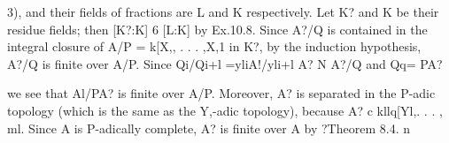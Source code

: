 \begin{theorem}[Theorem 11.2]\label{mcrt-auto-theorem-11-2}
\begin{mathematicalrecord}
3), and their fields of fractions are L and K respectively. Let
K? and K be their residue fields; then [K?:K] 6 [L:K] by Ex.10.8. Since A?/Q
is contained in the integral closure of A/P = k[X,, . . . ,X,1 in K?, by the
induction hypothesis, A?/Q is finite over A/P. Since
        Qi/Qi+l   =yliA!/yli+l
                                 A? N A?/Q and Qq= PA?

 we see that Al/PA? is finite over A/P. Moreover, A? is separated in the P-adic
topology (which is the same as the Y,-adic topology), because
 A? c kllq[Yl,. . . , ml. Since A is P-adically complete, A? is finite over A by
?Theorem 8.4. n


\end{mathematicalrecord}
\end{theorem}
